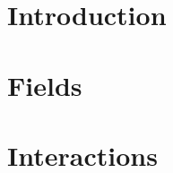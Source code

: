 \documentclass[
	fontsize=10pt, %
	twoside=false, %
	numbers=noenddot, %
]{kaobook}
\begin{document}
\mainmatter %

\part{Introduction}

\part{Fields}




\part{Interactions}




%


\backmatter %


\nocite{gruppi}
\nocite{mencuccini}
\nocite{PapaNotes}
\nocite{qftciotta}
\nocite{scattering}
\nocite{schwartz}
\nocite{tensori}
\printbibliography[heading=bibintoc, title=References] %

\end{document}
